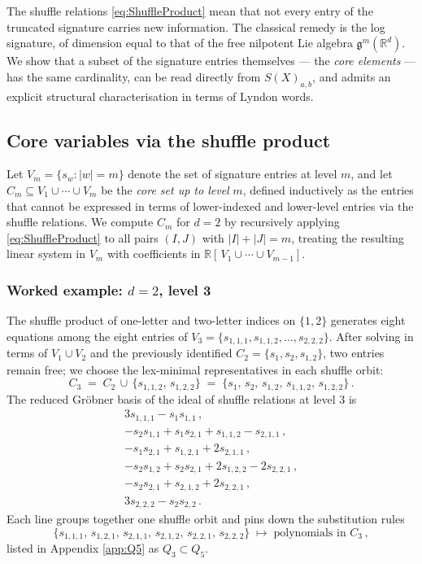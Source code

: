\documentclass[12pt,english]{article}
\theoremstyle{remark}
\begin{document}
The shuffle relations \eqref{eq:ShuffleProduct} mean that not every
entry of the truncated signature carries new information. The classical
remedy is the log signature, of dimension equal to that of the free
nilpotent Lie algebra $\mathfrak{g}^{m}(\mathbb{R}^{d})$. We show
that a subset of the signature entries themselves --- the \emph{core
elements} --- has the same cardinality, can be read directly from
$S(X)_{a,b}$, and admits an explicit structural characterisation
in terms of Lyndon words.

\subsection{Core variables via the shuffle product\label{subsec:Core-via-shuffle}}

Let $V_{m}=\{s_{w}:|w|=m\}$ denote the set of signature entries at
level $m$, and let $C_{m}\subseteq V_{1}\cup\cdots\cup V_{m}$ be
the \emph{core set up to level} $m$, defined inductively as the entries
that cannot be expressed in terms of lower-indexed and lower-level
entries via the shuffle relations. We compute $C_{m}$ for $d=2$
by recursively applying \eqref{eq:ShuffleProduct} to all pairs $(I,J)$
with $|I|+|J|=m$, treating the resulting linear system in $V_{m}$
with coefficients in $\mathbb{R}[\,V_{1}\cup\cdots\cup V_{m-1}]$.

\subsubsection{Worked example: $d=2$, level 3}

The shuffle product of one-letter and two-letter indices on $\{1,2\}$
generates eight equations among the eight entries of $V_{3}=\{s_{1,1,1},s_{1,1,2},\ldots,s_{2,2,2}\}$.
After solving in terms of $V_{1}\cup V_{2}$ and the previously identified
$C_{2}=\{s_{1},s_{2},s_{1,2}\}$, two entries remain free; we choose
the lex-minimal representatives in each shuffle orbit:
\[
C_{3}\;=\;C_{2}\,\cup\,\{s_{1,1,2},\,s_{1,2,2}\}\;=\;\{s_{1},\,s_{2},\,s_{1,2},\,s_{1,1,2},\,s_{1,2,2}\}\,.
\]
The reduced Gröbner basis of the ideal of shuffle relations at level
3 is
\begin{equation}
\begin{array}{l}
3s_{1,1,1}-s_{1}s_{1,1}\,,\\
-s_{2}s_{1,1}+s_{1}s_{2,1}+s_{1,1,2}-s_{2,1,1}\,,\\
-s_{1}s_{2,1}+s_{1,2,1}+2s_{2,1,1}\,,\\
-s_{2}s_{1,2}+s_{2}s_{2,1}+2s_{1,2,2}-2s_{2,2,1}\,,\\
-s_{2}s_{2,1}+s_{2,1,2}+2s_{2,2,1}\,,\\
3s_{2,2,2}-s_{2}s_{2,2}\,.
\end{array}\label{eq:GroebnerLevel3}
\end{equation}
Each line groups together one shuffle orbit and pins down the substitution
rules
\[
\bigl\{ s_{1,1,1},\,s_{1,2,1},\,s_{2,1,1},\,s_{2,1,2},\,s_{2,2,1},\,s_{2,2,2}\bigr\}\;\longmapsto\;\text{polynomials in }C_{3}\,,
\]
listed in Appendix \ref{app:Q5} as $Q_{3}\subset Q_{5}$.
\end{document}
